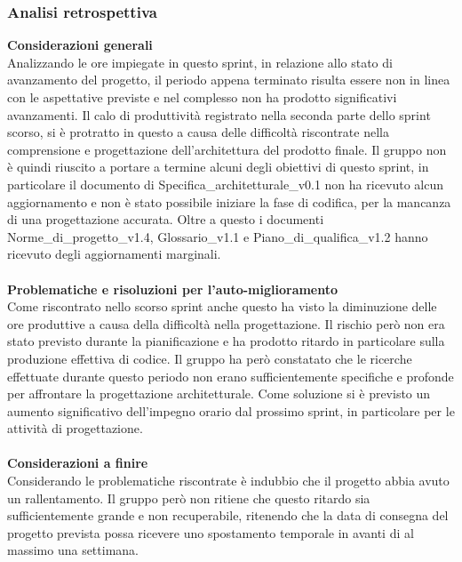 \subsubsection{Analisi retrospettiva}
\textbf{Considerazioni generali}\\
Analizzando le ore impiegate in questo sprint, in relazione allo stato di avanzamento del progetto, il periodo appena terminato risulta essere non in linea con le aspettative previste e nel complesso non ha prodotto significativi avanzamenti. Il calo di produttività registrato nella seconda parte dello sprint scorso, si è protratto in questo a causa delle difficoltà riscontrate nella comprensione e progettazione dell'architettura del prodotto finale. Il gruppo non è quindi riuscito a portare a termine alcuni degli obiettivi di questo sprint, in particolare il documento di Specifica\_architetturale\_v0.1 non ha ricevuto alcun aggiornamento e non è stato possibile iniziare la fase di codifica, per la mancanza di una progettazione accurata. Oltre a questo i documenti Norme\_di\_progetto\_v1.4, Glossario\_v1.1 e Piano\_di\_qualifica\_v1.2 hanno ricevuto degli aggiornamenti marginali. \\ \\
\textbf{Problematiche e risoluzioni per l'auto-miglioramento}\\
Come riscontrato nello scorso sprint anche questo ha visto la diminuzione delle ore produttive a causa della difficoltà nella progettazione. Il rischio però non era stato previsto durante la pianificazione e ha prodotto ritardo in particolare sulla produzione effettiva di codice. Il gruppo ha però constatato che le ricerche effettuate durante questo periodo non erano sufficientemente specifiche e profonde per affrontare la progettazione architetturale. Come soluzione si è previsto un aumento significativo dell'impegno orario dal prossimo sprint, in particolare per le attività di progettazione.\\ \\
\textbf{Considerazioni a finire}\\
Considerando le problematiche riscontrate è indubbio che il progetto abbia avuto un rallentamento. Il gruppo però non ritiene che questo ritardo sia sufficientemente grande e non recuperabile, ritenendo che la data di consegna del progetto prevista possa ricevere uno spostamento temporale in avanti di al massimo una settimana.
